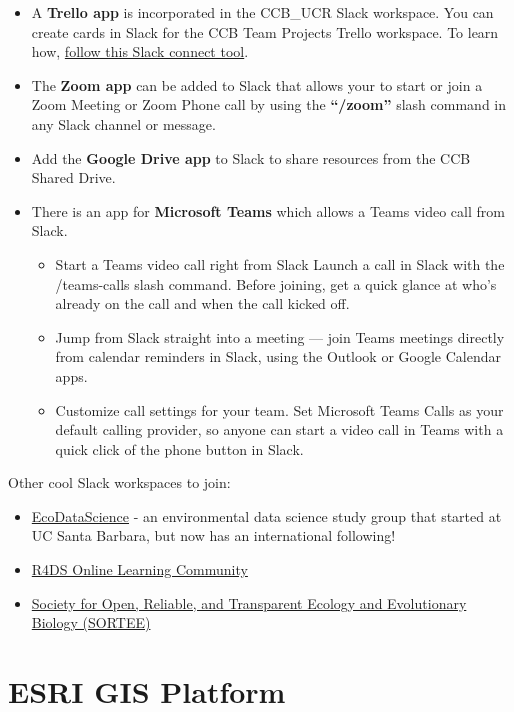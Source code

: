 \documentclass[
]{book}
\providecommand{\tightlist}{%
  \setlength{\itemsep}{0pt}\setlength{\parskip}{0pt}}
\begin{document}
\begin{itemize}
\tightlist
\item
  A \textbf{Trello app} is incorporated in the CCB\_UCR Slack workspace. You can create cards in Slack for the CCB Team Projects Trello workspace. To learn how, \href{https://slack.com/help/articles/231967387-Trello-for-Slack}{follow this Slack connect tool}.
\item
  The \textbf{Zoom app} can be added to Slack that allows your to start or join a Zoom Meeting or Zoom Phone call by using the \textbf{``/zoom''} slash command in any Slack channel or message.
\item
  Add the \textbf{Google Drive app} to Slack to share resources from the CCB Shared Drive.
\item
  There is an app for \textbf{Microsoft Teams} which allows a Teams video call from Slack.

  \begin{itemize}
  \tightlist
  \item
    Start a Teams video call right from Slack
    Launch a call in Slack with the /teams-calls slash command. Before joining, get a quick glance at who's already on the call and when the call kicked off.
  \item
    Jump from Slack straight into a meeting --- join Teams meetings directly from calendar reminders in Slack, using the Outlook or Google Calendar apps.
  \item
    Customize call settings for your team. Set Microsoft Teams Calls as your default calling provider, so anyone can start a video call in Teams with a quick click of the phone button in Slack.
  \end{itemize}
\end{itemize}

Other cool Slack workspaces to join:

\begin{itemize}
\item
  \href{https://eco-data-science.github.io/}{EcoDataScience} - an environmental data science study group that started at UC Santa Barbara, but now has an international following!
\item
  \href{https://www.rfordatasci.com}{R4DS Online Learning Community}
\item
  \href{https://www.sortee.org}{Society for Open, Reliable, and Transparent Ecology and Evolutionary Biology (SORTEE)}
\end{itemize}

\hypertarget{esri}{%
\chapter{ESRI GIS Platform}\label{esri}}
\end{document}
